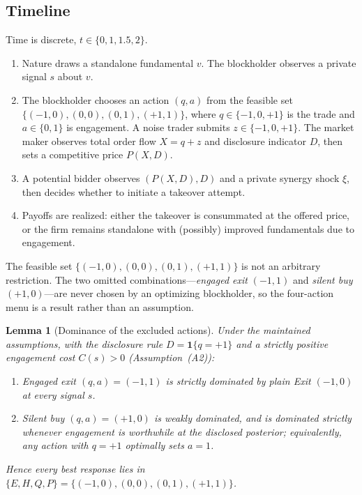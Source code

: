 \documentclass[11pt]{article}
\newtheorem{lemma}{Lemma}
\newcommand{\1}{\mathbf{1}}
\begin{document}
%
\subsection{Timeline}
%

Time is discrete, $t \in \{0, 1, 1.5, 2\}$.

\begin{enumerate}[leftmargin=2em]
\item[$t=0$:] Nature draws a standalone fundamental $v$. The blockholder observes a private signal $s$ about $v$.
\item[$t=1$:] The blockholder chooses an action $(q,a)$ from the feasible set $\{(-1,0),(0,0),(0,1),(+1,1)\}$, where $q \in \{-1,0,+1\}$ is the trade and $a \in \{0,1\}$ is engagement. A noise trader submits $z \in \{-1, 0, +1\}$. The market maker observes total order flow $X = q + z$ and disclosure indicator $D$, then sets a competitive price $P(X, D)$.
\item[$t=1.5$:] A potential bidder observes $(P(X,D), D)$ and a private synergy shock $\xi$, then decides whether to initiate a takeover attempt.
\item[$t=2$:] Payoffs are realized: either the takeover is consummated at the offered price, or the firm remains standalone with (possibly) improved fundamentals due to engagement.
\end{enumerate}

The feasible set $\{(-1,0),(0,0),(0,1),(+1,1)\}$ is not an arbitrary restriction. The two omitted combinations---\emph{engaged exit} $(-1,1)$ and \emph{silent buy} $(+1,0)$---are never chosen by an optimizing blockholder, so the four-action menu is a result rather than an assumption.

\begin{lemma}[Dominance of the excluded actions]
\label{lem:dominance}
Under the maintained assumptions, with the disclosure rule $D=\1\{q=+1\}$ and a strictly positive engagement cost $C(s)>0$ (Assumption~\textup{(A2)}):
\begin{enumerate}[leftmargin=2em,itemsep=2pt]
\item Engaged exit $(q,a)=(-1,1)$ is strictly dominated by plain Exit $(-1,0)$ at every signal $s$.
\item Silent buy $(q,a)=(+1,0)$ is weakly dominated, and is dominated strictly whenever engagement is worthwhile at the disclosed posterior; equivalently, any action with $q=+1$ optimally sets $a=1$.
\end{enumerate}
Hence every best response lies in $\{E,H,Q,P\}=\{(-1,0),(0,0),(0,1),(+1,1)\}$.
\end{lemma}
\end{document}

